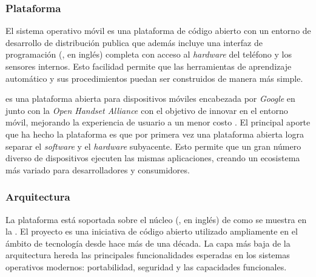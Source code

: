 \subsubsection{Plataforma}

El sistema operativo móvil  es una plataforma de código
abierto con un entorno de desarrollo de distribución publica que además
incluye una interfaz de programación (, en inglés) completa
con acceso al \emph{hardware} del teléfono y los sensores internos.
Esto facilidad permite que las herramientas de aprendizaje automático
y sus procedimientos puedan ser construidos de manera más simple. 

 es una plataforma abierta para dispositivos móviles
encabezada por \emph{Google} en junto con la \emph{Open Handset Alliance
\cite{OHA2008}} con el objetivo de innovar en el entorno móvil, mejorando
la experiencia de usuario a un menor costo \cite{Gargenta2014}. El
principal aporte que ha hecho la plataforma es que por primera vez
una plataforma abierta logra separar el \emph{software} y el \emph{hardware}
subyacente. Esto permite que un gran número diverso de dispositivos
ejecuten las mismas aplicaciones, creando un ecosistema más variado
para desarrolladores y consumidores. 

\subsubsection{Arquitectura}

La plataforma  está soportada sobre el núcleo (,
en inglés) de  como se muestra en la .
El proyecto  es una iniciativa de código abierto utilizado
ampliamente en el ámbito de tecnología desde hace más de una década.
La capa más baja de la arquitectura hereda las principales funcionalidades
esperadas en los sistemas operativos modernos: portabilidad, seguridad
y las capacidades funcionales.


